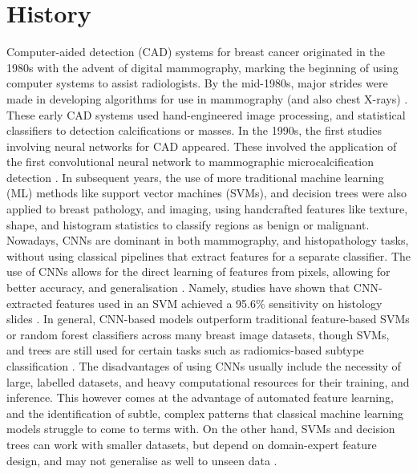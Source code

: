 \documentclass[../main]{subfiles}
\begin{document}
\section{History}
\label{sec:history}
Computer-aided detection (CAD) systems for breast cancer originated in the 1980s with the advent of digital mammography, marking the beginning of using computer systems to assist radiologists. By the mid-1980s, major strides were made in developing algorithms for use in mammography (and also chest X-rays) \autocite{https://doi.org/10.1118/1.3013555}. These early CAD systems used hand-engineered image processing, and statistical classifiers to detection calcifications or masses. In the 1990s, the first studies involving neural networks for CAD appeared. These involved the application of the first convolutional neural network to mammographic microcalcification detection \autocite{https://doi.org/10.1118/1.3013555}. In subsequent years, the use of more traditional machine learning (ML) methods like support vector machines (SVMs), and decision trees were also applied to breast pathology, and imaging, using handcrafted features like texture, shape, and histogram statistics to classify regions as benign or malignant. Nowadays, CNNs are dominant in both mammography, and histopathology tasks, without using classical pipelines that extract features for a separate classifier. The use of CNNs allows for the direct learning of features from pixels, allowing for better accuracy, and generalisation \autocite{araujo2017classification}. Namely, studies have shown that CNN-extracted features used in an SVM achieved a 95.6\% sensitivity on histology slides \autocite{araujo2017classification}. In general, CNN-based models outperform traditional feature-based SVMs or random forest classifiers across many breast image datasets, though SVMs, and trees are still used for certain tasks such as radiomics-based subtype classification \autocite{guo2024machine}. The disadvantages of using CNNs usually include the necessity of large, labelled datasets, and heavy computational resources for their training, and inference. This however comes at the advantage of automated feature learning, and the identification of subtle, complex patterns that classical machine learning models struggle to come to terms with. On the other hand, SVMs and decision trees can work with smaller datasets, but depend on domain-expert feature design, and may not generalise as well to unseen data \autocite{araujo2017classification}.
\end{document}
